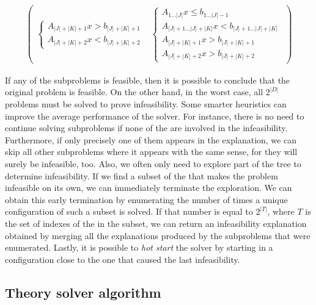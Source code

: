 \documentclass[runningheads]{llncs}
\begin{document}
\begin{equation}
\begin{gathered}
\begin{pmatrix}
\begin{cases}
                A_{|J| + |K| + 1} x > b_{|J| + |K| + 1}                   \\
                A_{|J| + |K| + 2} x < b_{|J| + |K| + 2}
            \end{cases}
             &
            \begin{cases}
                A_{1 \dots |J|} x \le b_{1 \dots |J| - 1}                 \\
                A_{|J| + 1\dots |J| + |K|} x < b_{|J| + 1\dots |J| + |K|} \\
                A_{|J| + |K| + 1} x > b_{|J| + |K| + 1}                   \\
                A_{|J| + |K| + 2} x > b_{|J| + |K| + 2}
            \end{cases}
        \end{pmatrix}
    \end{gathered}
\end{equation}

If any of the subproblems is feasible, then it is possible to conclude that the original problem is feasible.
On the other hand, in the worst case, all $2^{|D|}$ problems must be solved to prove infeasibility.
Some smarter heuristics can improve the average performance of the solver.
For instance, there is no need to continue solving subproblems if none of the \nqcs are involved in the infeasibility.
Furthermore, if only precisely one of them appears in the explanation, we can skip all other subproblems where it appears with the same sense, for they will surely be infeasible, too.
Also, we often only need to explore part of the tree to determine infeasibility.
If we find a subset of the \nqc that makes the problem infeasible on its own, we can immediately terminate the exploration.
We can obtain this early termination by enumerating the number of times a unique configuration of such a subset is solved.
If that number is equal to $2^{|T|}$, where $T$ is the set of indexes of the \nqcs in the subset, we can return an infeasibility explanation obtained by merging all the explanations produced by the subproblems that were enumerated.
Lastly, it is possible to \textit{hot start} the solver by starting in a configuration close to the one that caused the last infeasibility.

\subsection{Theory solver algorithm}
\end{document}
